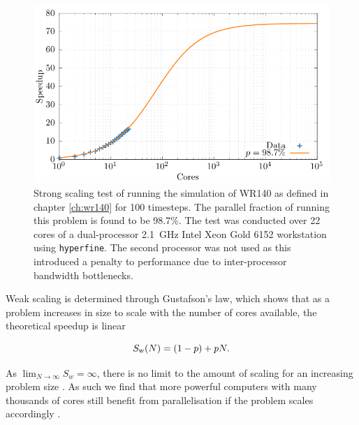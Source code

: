 \begin{figure}
  \centering
  \includegraphics{assets/athena-amdahl/amdahl.pdf}
  \caption[Strong scaling test of \athena]{Strong scaling test of \athena{} running the simulation of WR140 as defined in chapter \ref{ch:wr140} for 100 timesteps. The parallel fraction of \athena{} running this problem is found to be 98.7\%. The test was conducted over 22 cores of a dual-processor \SI{2.1}{\giga\hertz} Intel Xeon Gold 6152 workstation using \texttt{hyperfine}. The second processor was not used as this introduced a penalty to performance due to inter-processor bandwidth bottlenecks.}
  \label{fig:amdahl-athena}
\end{figure}

Weak scaling is determined through Gustafson's law, which shows that as a problem increases in size to scale with the number of cores available, the theoretical speedup is linear

\begin{equation}
  S_\text{w}(N) = (1-p) + pN.
\end{equation}

\noindent
As $\lim_{N\rightarrow\infty} S_w = \infty$, there is no limit to the amount of scaling for an increasing problem size \parencite{gustafsonReevaluatingAmdahlLaw1988}.
As such we find that more powerful computers with many thousands of cores still benefit from parallelisation if the problem scales accordingly \parencite[Ch.~2]{pachecoIntroductionParallelProgramming2022}.

